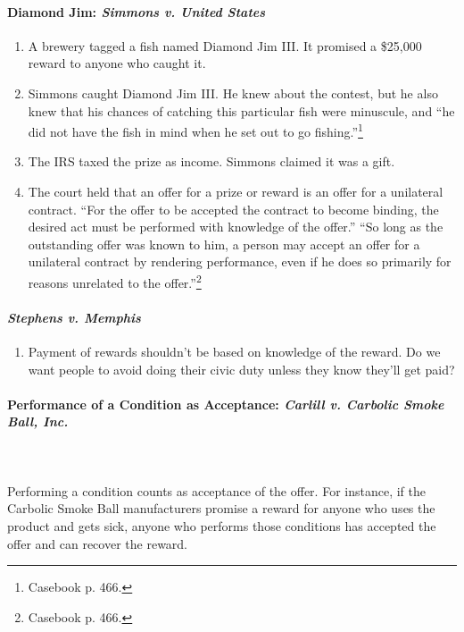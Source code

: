 \paragraph{Diamond Jim: \emph{Simmons v. United States}}

\begin{enumerate}
    \item A brewery tagged a fish named Diamond Jim III. It promised a 
    \$25,000 reward to anyone who caught it.
    \item Simmons caught Diamond Jim III. He knew about the contest, but he 
    also knew that his chances of catching this particular fish were 
    minuscule, and ``he did not have the fish in mind when he set out to go 
    fishing.''\footnote{Casebook p. 466.}
    \item The IRS taxed the prize as income. Simmons claimed it was a gift.
    \item The court held that an offer for a prize or reward is an offer for a 
    unilateral contract. ``For the offer to be accepted the contract to become 
    binding, the desired act must be performed with knowledge of the 
    offer.'' ``So long as the outstanding offer was known to him, a person may 
    accept an offer for a unilateral contract by rendering performance, even 
    if he does so primarily for reasons unrelated to the 
    offer.''\footnote{Casebook p. 466.}
\end{enumerate}

\paragraph{\emph{Stephens v. Memphis}}

\begin{enumerate}
    \item Payment of rewards shouldn't be based on knowledge of the reward. Do 
    we want people to avoid doing their civic duty unless they know they'll 
    get paid?
\end{enumerate}

\paragraph{Performance of a Condition as Acceptance: \emph{Carlill v. Carbolic 
Smoke Ball, Inc.}}
~\\\\
Performing a condition counts as acceptance of the offer. For 
instance, if the Carbolic Smoke Ball manufacturers promise a reward for anyone 
who uses the product and gets sick, anyone who performs those conditions has 
accepted the offer and can recover the reward.


